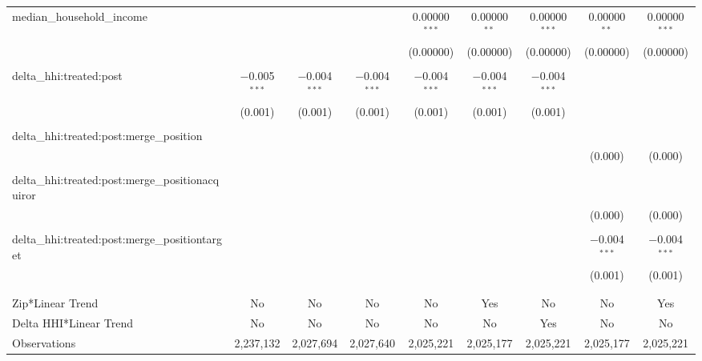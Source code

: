 \begin{table}[H]
{\begin{tabular}{@{\extracolsep{5pt}}lcccccccc}
  median\_household\_income &  &  &  & 0.00000$^{***}$ & 0.00000$^{**}$ & 0.00000$^{***}$ & 0.00000$^{**}$ & 0.00000$^{***}$ \\  

   &  &  &  & (0.00000) & (0.00000) & (0.00000) & (0.00000) & (0.00000) \\  

   & & & & & & & & \\  

  delta\_hhi:treated:post & $-$0.005$^{***}$ & $-$0.004$^{***}$ & $-$0.004$^{***}$ & $-$0.004$^{***}$ & $-$0.004$^{***}$ & $-$0.004$^{***}$ &  &  \\  

   & (0.001) & (0.001) & (0.001) & (0.001) & (0.001) & (0.001) &  &  \\  

   & & & & & & & & \\  

  delta\_hhi:treated:post:merge\_position &  &  &  &  &  &  &  &  \\  

   &  &  &  &  &  &  & (0.000) & (0.000) \\  

   & & & & & & & & \\  

  delta\_hhi:treated:post:merge\_positionacquiror &  &  &  &  &  &  &  &  \\  

   &  &  &  &  &  &  & (0.000) & (0.000) \\  

   & & & & & & & & \\  

  delta\_hhi:treated:post:merge\_positiontarget &  &  &  &  &  &  & $-$0.004$^{***}$ & $-$0.004$^{***}$ \\  

   &  &  &  &  &  &  & (0.001) & (0.001) \\  

   & & & & & & & & \\  

 \hline \\[-1.8ex]  

 Zip*Linear Trend & No & No & No & No & Yes & No & No & Yes \\  

 Delta HHI*Linear Trend & No & No & No & No & No & Yes & No & No \\  

 Observations & 2,237,132 & 2,027,694 & 2,027,640 & 2,025,221 & 2,025,177 & 2,025,221 & 2,025,177 & 2,025,221 \\  


\end{tabular}}
\end{table}
